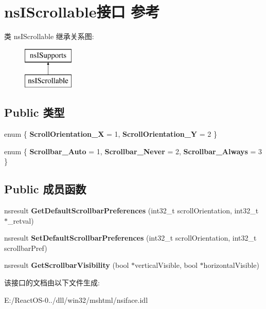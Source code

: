 \hypertarget{interfacens_i_scrollable}{}\section{ns\+I\+Scrollable接口 参考}
\label{interfacens_i_scrollable}
类 ns\+I\+Scrollable 继承关系图\+:\begin{figure}[H]
\begin{center}
\leavevmode
\includegraphics[height=2.000000cm]{interfacens_i_scrollable}
\end{center}
\end{figure}
\subsection*{Public 类型}
\begin{DoxyCompactItemize}
\item 
\mbox{\label{interfacens_i_scrollable_a57fdd4a4be3d1656db577c33680c690f}} 
enum \{ {\bfseries Scroll\+Orientation\+\_\+X} = 1, 
{\bfseries Scroll\+Orientation\+\_\+Y} = 2
 \}
\item 
\mbox{\label{interfacens_i_scrollable_a4a01a409bd5d7ed846d3d5aeff5c805d}} 
enum \{ {\bfseries Scrollbar\+\_\+\+Auto} = 1, 
{\bfseries Scrollbar\+\_\+\+Never} = 2, 
{\bfseries Scrollbar\+\_\+\+Always} = 3
 \}
\end{DoxyCompactItemize}
\subsection*{Public 成员函数}
\begin{DoxyCompactItemize}
\item 
\mbox{\label{interfacens_i_scrollable_a08dea8a9e99d719d2bdb7d323919a3c5}} 
nsresult {\bfseries Get\+Default\+Scrollbar\+Preferences} (int32\+\_\+t scroll\+Orientation, int32\+\_\+t $\ast$\+\_\+retval)
\item 
\mbox{\label{interfacens_i_scrollable_a502bd7f96c215ff5bcbab80774e7b188}} 
nsresult {\bfseries Set\+Default\+Scrollbar\+Preferences} (int32\+\_\+t scroll\+Orientation, int32\+\_\+t scrollbar\+Pref)
\item 
\mbox{\label{interfacens_i_scrollable_a88495419e8b70f32d8b4852f2bbb3e84}} 
nsresult {\bfseries Get\+Scrollbar\+Visibility} (bool $\ast$vertical\+Visible, bool $\ast$horizontal\+Visible)
\end{DoxyCompactItemize}


该接口的文档由以下文件生成\+:\begin{DoxyCompactItemize}
\item 
E\+:/\+React\+O\+S-\/0../dll/win32/mshtml/nsiface.\+idl\end{DoxyCompactItemize}

